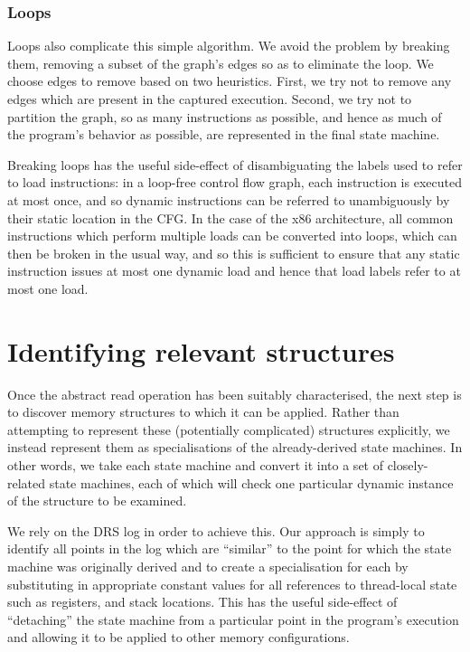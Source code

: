 \documentclass[10pt,twocolumn,preprint,natbib,authoryear]{sigplanconf}
\begin{document}
\subsubsection{Loops}
Loops also complicate this simple algorithm.  We avoid the problem by
breaking them, removing a subset of the graph's edges so as to
eliminate the loop.  We choose edges to remove based on two
heuristics.  First, we try not to remove any edges which are present
in the captured execution.  Second, we try not to partition the graph,
so as many instructions as possible, and hence as much of the
program's behavior as possible, are represented in the final state
machine.

Breaking loops has the useful side-effect of disambiguating the labels
used to refer to load instructions: in a loop-free control flow graph,
each instruction is executed at most once, and so dynamic instructions
can be referred to unambiguously by their static location in the CFG.
In the case of the x86 architecture, all common instructions which
perform multiple loads can be converted into loops, which can then be
broken in the usual way, and so this is sufficient to ensure that any
static instruction issues at most one dynamic load and hence that load
labels refer to at most one load.

\section{Identifying relevant structures}

Once the abstract read operation has been suitably characterised, the
next step is to discover memory structures to which it can be applied.
Rather than attempting to represent these (potentially complicated)
structures explicitly, we instead represent them as specialisations of
the already-derived state machines.  In other words, we take each
state machine and convert it into a set of closely-related state
machines, each of which will check one particular dynamic instance of
the structure to be examined.

We rely on the DRS log in order to achieve this.  Our approach is
simply to identify all points in the log which are ``similar'' to the
point for which the state machine was originally derived and to create
a specialisation for each by substituting in appropriate constant
values for all references to thread-local state such as registers, and
stack locations.  This has the useful side-effect of ``detaching'' the
state machine from a particular point in the program's execution and
allowing it to be applied to other memory configurations.
\end{document}
